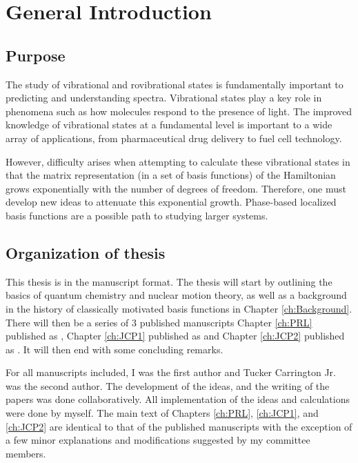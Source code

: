 \afterpreface \doublespacing
\chapter{General Introduction}\label{ch:Introduction}

\section{Purpose}
The study of vibrational and rovibrational states is fundamentally important to predicting and understanding spectra.  Vibrational states play a key role in phenomena such as how molecules respond to the presence of light.  The improved knowledge of vibrational states at a fundamental level is important to a wide array of applications, from pharmaceutical drug delivery to fuel cell technology. 


However, difficulty arises when attempting to calculate these vibrational states in that the matrix representation (in a set of basis functions) of the Hamiltonian grows exponentially with the number of degrees of freedom.  Therefore, one must develop new ideas to attenuate this exponential growth.  Phase-based localized basis functions are a possible path to studying larger systems.  




\section{Organization of thesis}

This thesis is in the manuscript format.  The thesis will start by outlining the basics of quantum chemistry and nuclear motion theory, as well as a background in the history of classically motivated basis functions in Chapter \ref{ch:Background}.  There will then be a series of 3 published manuscripts Chapter \ref{ch:PRL} published as , Chapter \ref{ch:JCP1} published as  and Chapter \ref{ch:JCP2} published as .  It will then end with some concluding remarks. 


For all manuscripts included, I was the first author and Tucker Carrington Jr. was the second author.  The development of the ideas, and the writing of the papers was done collaboratively.  All implementation of the ideas and calculations were done by myself.  The main text of Chapters \ref{ch:PRL}, \ref{ch:JCP1}, and \ref{ch:JCP2} are identical to that of the published manuscripts with the exception of a few minor explanations and modifications suggested by my committee members. 